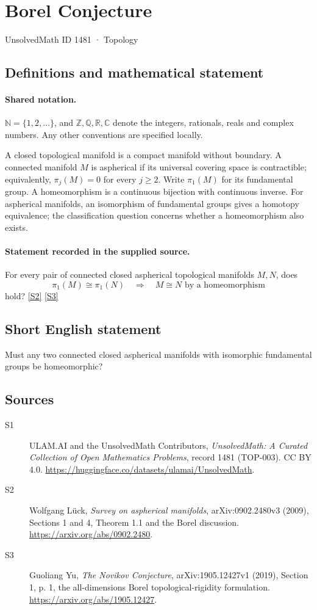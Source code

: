 \documentclass[11pt]{article}
\newcommand{\sref}[2]{\hyperlink{source:#1:#2}{[S#2]}}
\begin{document}
\setcounter{section}{1480}
\section{Borel Conjecture}\label{1481}
{\small\sffamily UnsolvedMath ID 1481 · Topology}
\subsection{Definitions and mathematical statement}

\paragraph{Shared notation.}$\mathbb N=\{1,2,\ldots\}$, and $\mathbb Z,\mathbb Q,\mathbb R,\mathbb C$ denote the integers, rationals, reals and complex numbers. Any other conventions are specified locally.


A closed topological manifold is a compact manifold without boundary.
A connected manifold \(M\) is aspherical if its universal covering space is
contractible; equivalently, \(\pi_j(M)=0\) for every \(j\ge2\).
Write \(\pi_1(M)\) for its fundamental group. A homeomorphism is a
continuous bijection with continuous inverse. For aspherical manifolds,
an isomorphism of fundamental groups gives a homotopy equivalence;
the classification question concerns whether a homeomorphism also exists.
\paragraph{Statement recorded in the supplied source.}
For every pair of connected closed aspherical topological manifolds
\(M,N\), does
\[
 \pi_1(M)\cong\pi_1(N)\quad\Longrightarrow\quad M\cong N
             \text{ by a homeomorphism}
\]
hold? \sref{1481}{2} \sref{1481}{3}
\subsection{Short English statement}
Must any two connected closed aspherical manifolds with isomorphic fundamental groups be homeomorphic?
\subsection{Sources}
\begin{description}
\item[\hypertarget{source:1481:1}{S1}] ULAM.AI and the UnsolvedMath Contributors, \emph{UnsolvedMath: A Curated Collection of Open Mathematics Problems}, record 1481 (TOP-003). CC BY 4.0. \url{https://huggingface.co/datasets/ulamai/UnsolvedMath}.
\item[\hypertarget{source:1481:2}{S2}] Wolfgang L\"uck, \emph{Survey on aspherical manifolds}, arXiv:0902.2480v3 (2009), Sections 1 and 4, Theorem 1.1 and the Borel discussion. \url{https://arxiv.org/abs/0902.2480}.
\item[\hypertarget{source:1481:3}{S3}] Guoliang Yu, \emph{The Novikov Conjecture}, arXiv:1905.12427v1 (2019), Section 1, p. 1, the all-dimensions Borel topological-rigidity formulation. \url{https://arxiv.org/abs/1905.12427}.
\end{description}
\label{end:1481}
\end{document}
